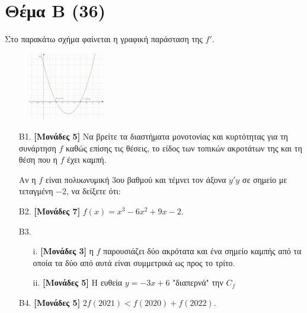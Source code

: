 \documentclass[14pt]{extarticle}
\begin{document}
\section*{Θέμα Β (36)}
Στο παρακάτω σχήμα φαίνεται η γραφική παράσταση της $f'$.
\begin{figure}[H]
 \includegraphics[width=0.3\textwidth]{2021Prosomeivsi2.png}
 \centering
\end{figure}
\begin{enumerate}
 \item[Β1.] \textbf{[Μονάδες 5]} Να βρείτε τα διαστήματα μονοτονίας και κυρτότητας για τη συνάρτηση $f$ καθώς επίσης τις θέσεις, το είδος των τοπικών ακροτάτων της και τη θέση που η $f$ έχει καμπή.
       
       Αν η $f$ είναι πολυωνυμική 3ου βαθμού και τέμνει τον άξονα $y'y$ σε σημείο με τεταγμένη $-2$, να δείξετε ότι:
       
 \item[Β2.] \textbf{[Μονάδες 7]} $f(x)=x^3-6x^2+9x-2$.
 \item[Β3.]
       \begin{enumerate}
        \item[i.] \textbf{[Μονάδες 3]} η $f$ παρουσιάζει δύο ακρότατα και ένα σημείο καμπής από τα οποία τα δύο από αυτά είναι συμμετρικά ως προς το τρίτο.
        \item[ii.] \textbf{[Μονάδες 5]} Η ευθεία $y=-3x+6$ "διαπερνά" την $C_f$
       \end{enumerate}
 \item[Β4.] \textbf{[Μονάδες 5]} $2f(2021)<f(2020)+f(2022)$.
\end{enumerate}
\end{document}
